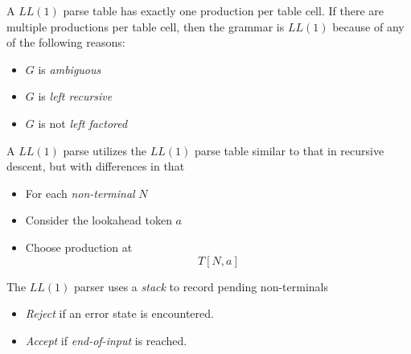 \begin{remark}
    A $LL(1)$ parse table has exactly one production per table cell. If there are multiple productions per table cell, then the grammar is $LL(1)$ because of any of the following reasons:
    \begin{itemize}
        \item $G$ is \textit{ambiguous}
        \item $G$ is \textit{left recursive}
        \item $G$ is not \textit{left factored}
    \end{itemize}
\end{remark}

\begin{definition}
    A $LL(1)$ parse utilizes the $LL(1)$ parse table similar to that in recursive descent, but with differences in that
    \begin{itemize}
        \item For each \textit{non-terminal} $N$
        \item Consider the lookahead token $a$
        \item Choose production at
            \begin{equation}
                T[N, a]
            \end{equation}
    \end{itemize}
    
    The $LL(1)$ parser uses a \textit{stack} to record pending non-terminals
    \begin{itemize}
        \item \textit{Reject} if an error state is encountered.
        \item \textit{Accept} if \textit{end-of-input} is reached.
    \end{itemize}
\end{definition}

